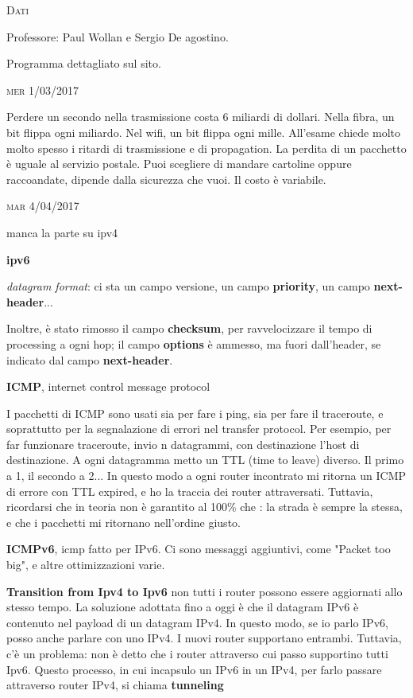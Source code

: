 \documentclass[a4paper,10pt]{article} %
\newcommand{\msection}[1]{%
    {\bigskip \par \normalsize \textsc {#1}}\par}
\renewcommand{\b}[1]{%
    {\textbf{#1}}}
\begin{document}
\msection{Dati}
Professore: Paul Wollan e Sergio De agostino.

Programma dettagliato sul sito.


\msection{mer 1/03/2017}

Perdere un secondo nella trasmissione costa 6 miliardi di dollari.
Nella fibra, un bit flippa ogni miliardo. Nel wifi, un bit flippa ogni mille.
All'esame chiede molto molto spesso i ritardi di trasmissione e di propagation.
La perdita di un pacchetto è uguale al servizio postale. Puoi scegliere di mandare cartoline oppure raccoandate, dipende dalla sicurezza che vuoi. Il costo è variabile.


\msection{mar 4/04/2017}

{\huge manca la parte su ipv4}

\b{ipv6}

\emph{datagram format}: ci sta un campo versione, un campo \b{priority}, un campo \b{next-header}...

Inoltre, è stato rimosso il campo \b{checksum}, per ravvelocizzare il tempo di processing a ogni hop; il campo \b{options} è ammesso, ma fuori dall'header, se indicato dal campo \b{next-header}.

\b{ICMP}, internet control message protocol

I pacchetti di ICMP sono usati sia per fare i ping, sia per fare il traceroute, e soprattutto per la segnalazione di errori nel transfer protocol. 
Per esempio, per far funzionare traceroute, invio n datagrammi, con destinazione l'host di destinazione. A ogni datagramma metto un TTL (time to leave) diverso. Il primo a 1, il secondo a 2... In questo modo a ogni router incontrato mi ritorna un ICMP di errore con TTL expired, e ho la traccia dei router attraversati. Tuttavia, ricordarsi che in teoria non è garantito al 100\% che : la strada è sempre la stessa, e che i pacchetti mi ritornano nell'ordine giusto. 

\b{ICMPv6}, icmp fatto per IPv6.  Ci sono messaggi aggiuntivi, come "Packet too big", e altre ottimizzazioni varie.

\b{Transition from Ipv4 to Ipv6} non tutti i router possono essere aggiornati allo stesso tempo. La soluzione adottata fino a oggi è che il datagram IPv6  è contenuto nel payload di un datagram IPv4. In questo modo, se io parlo IPv6, posso anche parlare con uno IPv4. I nuovi router supportano entrambi. Tuttavia, c'è un problema: non è detto che i router attraverso cui passo supportino tutti Ipv6. Questo processo, in cui incapsulo un IPv6 in un IPv4, per farlo passare attraverso router IPv4, si chiama \b{tunneling}
\end{document}
